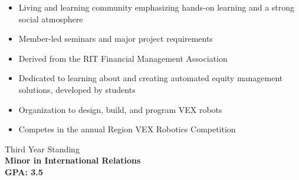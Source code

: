 \documentclass[10pt,a4paper,ragged2e,withhyper]{altacv}
\begin{document}
\begin{paracol}{2}
\medskip


\begin{itemize}
    \item Living and learning community emphasizing hands-on learning and a strong social atmosphere
    \item Member-led seminars and major project requirements
\end{itemize}

\divider

\begin{itemize}
    \item Derived from the RIT Financial Management Association
    \item Dedicated to learning about and creating automated equity management solutions, developed by students
\end{itemize}

\divider

\begin{itemize}
    \item Organization to design, build, and program VEX robots
    \item Competes in the annual Region VEX Robotics Competition
\end{itemize}
\switchcolumn


Third Year Standing\\
\textbf{Minor in International Relations}\\
\textbf{GPA: 3.5}

\medskip


\par\smallskip
{}
\par\smallskip
{}
\par\medskip


\end{paracol}
\end{document}
